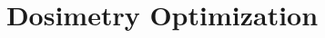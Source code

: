 \documentclass{article}
\title{Dosimetry Optimization}
\date{}
\begin{document}
	\maketitle
	\setcounter{tocdepth}{5}
	\tableofcontents
	
	\begin{abstract}
		
	\end{abstract}
	
	
	
	
	
\end{document}
